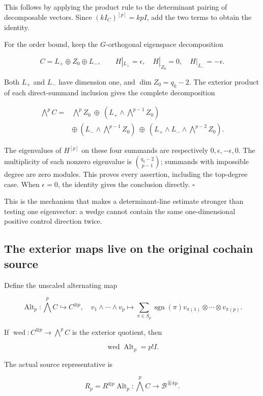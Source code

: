 This follows by applying the product rule to the determinant pairing of
decomposable vectors. Since \((kI_C)^{[p]}=kpI\), add the two terms to
obtain the identity.

For the order bound, keep the \(G\)-orthogonal eigenspace decomposition

\[
C=L_+\oplus Z_0\oplus L_-,
\qquad H|_{L_+}=\epsilon,\quad H|_{Z_0}=0,\quad H|_{L_-}=-\epsilon.
\]

Both \(L_+\) and \(L_-\) have dimension one, and \(\dim Z_0=q_k-2\). The
exterior product of each direct-summand inclusion gives the complete
decomposition

\[
\begin{aligned}
\bigwedge^p C={}&\bigwedge^p Z_0
\ \oplus\ (L_+\wedge\bigwedge^{p-1}Z_0)\\
&\oplus\ (L_-\wedge\bigwedge^{p-1}Z_0)
\ \oplus\ (L_+\wedge L_-\wedge\bigwedge^{p-2}Z_0).
\end{aligned}
\]

The eigenvalues of \(H^{[p]}\) on these four summands are respectively
\(0,\epsilon,-\epsilon,0\). The multiplicity of each nonzero eigenvalue
is \(\binom{q_k-2}{p-1}\); summands with impossible degree are zero
modules. This proves every assertion, including the top-degree case.
When \(\epsilon=0\), the identity gives the conclusion directly.
\(\square\)

This is the mechanism that makes a determinant-line estimate stronger
than testing one eigenvector: a wedge cannot contain the same
one-dimensional positive control direction twice.

\subsection{The exterior maps live on the original cochain
source}\label{exttrace-the-exterior-maps-live-on-the-original-cochain-source}

Define the unscaled alternating map

\[
\operatorname{Alt}_p:\bigwedge^p C\hookrightarrow C^{\otimes p},
\quad
v_1\wedge\cdots\wedge v_p\mapsto
\sum_{\pi\in S_p}\operatorname{sgn}(\pi)
 v_{\pi(1)}\otimes\cdots\otimes v_{\pi(p)}.
\]

If \(\operatorname{wed}:C^{\otimes p}\to\bigwedge^p C\) is the exterior
quotient, then

\[
\operatorname{wed}\operatorname{Alt}_p=p!I.
\]

The actual source representative is

\[
\boxed{
R_p=R^{\otimes p}\operatorname{Alt}_p:
\bigwedge^p C\longrightarrow\mathscr B^{\widehat\otimes kp}.
}
\]

